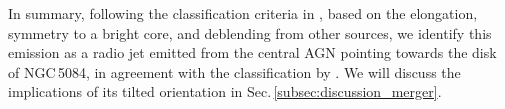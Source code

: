 \documentclass[modern]{aastex631}
\begin{document}
In summary, following the classification criteria in \citet{bridle+1984araa22_319}, based on the elongation, symmetry to a bright core, and deblending from other sources, we identify this emission as a radio jet emitted from the central AGN pointing towards the disk of NGC\,5084, in agreement with the classification by \citet{irwin+2019aj158_21}. We will discuss the implications of its tilted orientation in Sec.\,\ref{subsec:discussion_merger}. 


\end{document}
